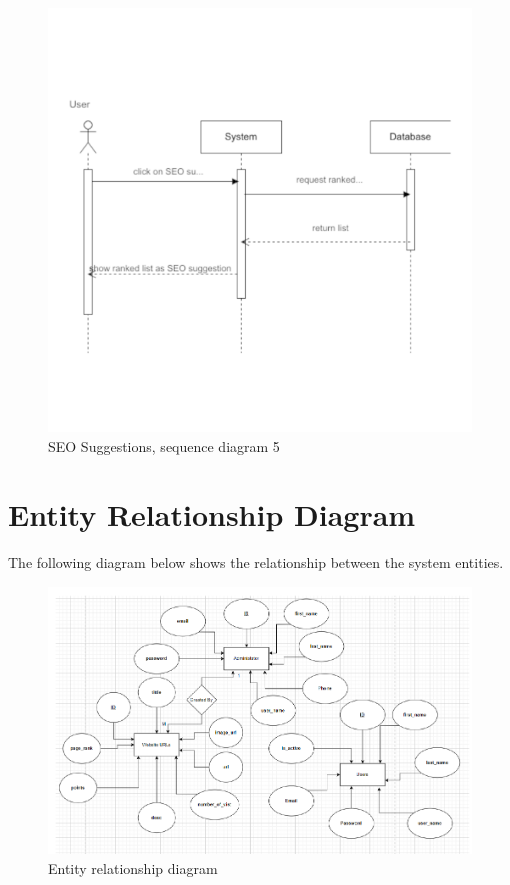\documentclass{scrartcl}
\begin{document}
\begin{figure}[H]
  \begin{center}
    \caption{SEO Suggestions, sequence diagram 5}
    \includegraphics[scale=0.72]{seq-diagram-5.png}
  \end{center}
\end{figure}

\newpage

\section{Entity Relationship Diagram}

The following diagram below shows the relationship between the system entities.

\begin{figure}[H]
  \begin{center}
    \caption{Entity relationship diagram}
    \includegraphics[scale=0.95]{erd-diagram.png}
  \end{center}
\end{figure}
\end{document}
